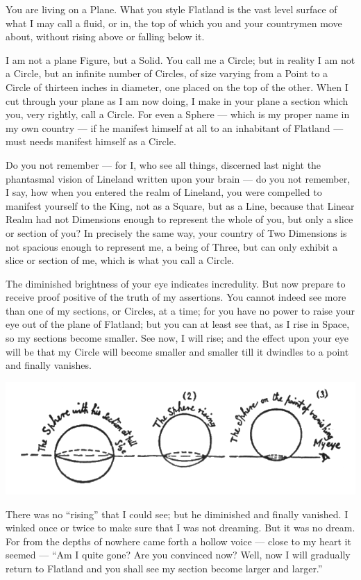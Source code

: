\documentclass[12pt, a4paper, twoside]{memoir}
\begin{document}
You are living on a Plane. What you style Flatland is the vast level surface
of what I may call a fluid, or in, the top of which you and your countrymen
move about, without rising above or falling below it.

I am not a plane Figure, but a Solid. You call me a Circle; but in reality I
am not a Circle, but an infinite number of Circles, of size varying from a
Point to a Circle of thirteen inches in diameter, one placed on the top of the
other. When I cut through your plane as I am now doing, I make in your plane a
section which you, very rightly, call a Circle. For even a Sphere --- which is
my proper name in my own country --- if he manifest himself at all to an
inhabitant of Flatland --- must needs manifest himself as a Circle.

Do you not remember --- for I, who see all things, discerned last night the
phantasmal vision of Lineland written upon your brain --- do you not remember, I
say, how when you entered the realm of Lineland, you were compelled to
manifest yourself to the King, not as a Square, but as a Line, because that
Linear Realm had not Dimensions enough to represent the whole of you, but only
a slice or section of you? In precisely the same way, your country of Two
Dimensions is not spacious enough to represent me, a being of Three, but can
only exhibit a slice or section of me, which is what you call a Circle.

The diminished brightness of your eye indicates incredulity. But now prepare
to receive proof positive of the truth of my assertions. You cannot indeed see
more than one of my sections, or Circles, at a time; for you have no power to
raise your eye out of the plane of Flatland; but you can at least see that, as
I rise in Space, so my sections become smaller. See now, I will rise; and the
effect upon your eye will be that my Circle will become smaller and smaller
till it dwindles to a point and finally vanishes.

\includegraphics[trim=20mm 0mm 0mm 0mm,width=\linewidth]{fig8}

There was no ``rising'' that I could see; but he diminished and finally
vanished. I winked once or twice to make sure that I was not dreaming. But it
was no dream. For from the depths of nowhere came forth a hollow voice --- close
to my heart it seemed --- ``Am I quite gone? Are you convinced now? Well, now I
will gradually return to Flatland and you shall see my section become larger
and larger.''
\end{document}
